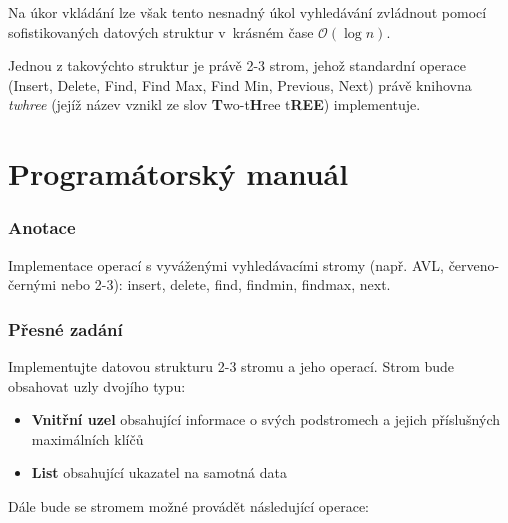 \documentclass[11pt,a4paper]{article}
\begin{document}
Na úkor vkládání lze však tento nesnadný úkol vyhledávání  zvládnout pomocí sofistikovaných datových struktur v~krásném čase
$\mathcal{O}(\log n)$.

Jednou z takovýchto struktur je právě 2-3 strom, jehož standardní operace
(Insert, Delete, Find, Find Max, Find Min, Previous, Next) právě kni\-hovna
\textit{twhree} (jejíž název vznikl ze slov \textbf{T}wo-t\textbf{H}ree
t\textbf{REE}) implementuje.

\pagebreak

\part{Programátorský manuál}
\section{Anotace}
Implementace operací s vyváženými vyhledávacími stromy (např. AVL,
červe\-no-černými nebo 2-3): insert, delete, find, findmin, findmax, next. 

\section{Přesné zadání}
Implementujte datovou strukturu 2-3 stromu a jeho operací.
Strom bude obsahovat uzly dvojího typu:

\renewcommand{\labelitemi}{$\spadesuit$}

\begin{itemize}
\item \textbf{Vnitřní uzel} obsahující informace o svých podstromech a jejich
přísluš\-ných maximálních klíčů
\item \textbf{List} obsahující ukazatel na samotná data
\end{itemize}

Dále bude se stromem možné provádět následující operace:

\renewcommand{\labelitemi}{$\clubsuit$}
\end{document}
